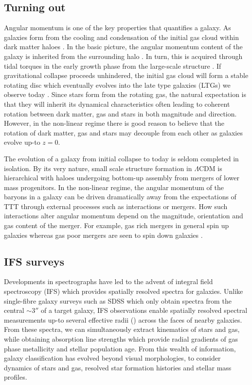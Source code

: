 \subsection{Turning out}
Angular momentum is one of the key properties that quantifies a galaxy. As galaxies form from the cooling and condensation of the initial gas cloud within dark matter haloes \citep{white1978, mo1998}. In the basic picture, the angular momentum content of the galaxy is inherited from the surrounding halo \citep[][]{fall1980}. In turn, this is acquired through tidal torques in the early growth phase from the large-scale structure \citep[e.g.][]{peebles1969, Doroshkevich1970}. If gravitational collapse proceeds unhindered, the initial gas cloud will form a stable rotating disc which eventually evolves into the late type galaxies (LTGs) we observe today \citep{white1978}. Since stars form from the rotating gas, the natural expectation is that they will inherit its dynamical characteristics often leading to coherent rotation between dark matter, gas and stars in both magnitude and direction. However, in the non-linear regime there is good reason to believe that the rotation of dark matter, gas and stars may decouple from each other as galaxies evolve up-to $z=0$. 

The evolution of a galaxy from initial collapse to today is seldom completed in isolation. By its very nature, small scale structure formation in $\Lambda$CDM is hierarchical with haloes undergoing bottom-up assembly from mergers of lower mass progenitors. In the non-linear regime, the angular momentum of the baryons in a galaxy can be driven dramatically away from the expectations of TTT through external processes such as interactions or mergers. How such interactions alter angular momentum depend on the magnitude, orientation and gas content of the merger. For example, gas rich mergers in general spin up galaxies whereas gas poor mergers are seen to spin down galaxies \citep[][]{lagos2017,lagos2018}.

\subsection{IFS surveys} \label{sec:ifs_surveys_intro}
Developments in spectrographs have led to the advent of integral field spectroscopy (IFS) which provides spatially resolved spectra for galaxies. Unlike single-fibre galaxy surveys such as SDSS which only obtain spectra from the central $\sim 3 ''$ of a target galaxy, IFS observations enable spatially resolved spectral measurements up-to several effective radii (\re) across the faces of nearby galaxies. From these spectra, we can simultaneously extract kinematics of stars and gas, while obtaining absorption line strengths which provide radial gradients of gas phase metallicity and stellar population age. From this wealth of information, galaxy classification has evolved beyond visual morphologies, to consider dynamics of stars and gas, resolved star formation histories and stellar mass profiles. 

